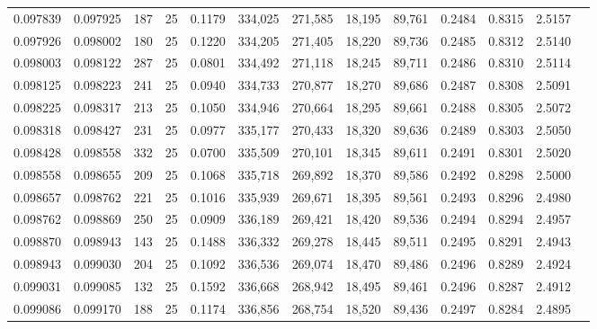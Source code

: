\begin{tabular}{rrrrrrrrrrrrr}
0.097839 & 0.097925 &   187 &  25 &                                     0.1179 & 334,025 & 271,585 &  18,195 &  89,761 & 0.2484 & 0.8315 & 2.5157 \\
0.097926 & 0.098002 &   180 &  25 &                                     0.1220 & 334,205 & 271,405 &  18,220 &  89,736 & 0.2485 & 0.8312 & 2.5140 \\
0.098003 & 0.098122 &   287 &  25 &                                     0.0801 & 334,492 & 271,118 &  18,245 &  89,711 & 0.2486 & 0.8310 & 2.5114 \\
0.098125 & 0.098223 &   241 &  25 &                                     0.0940 & 334,733 & 270,877 &  18,270 &  89,686 & 0.2487 & 0.8308 & 2.5091 \\
0.098225 & 0.098317 &   213 &  25 &                                     0.1050 & 334,946 & 270,664 &  18,295 &  89,661 & 0.2488 & 0.8305 & 2.5072 \\
0.098318 & 0.098427 &   231 &  25 &                                     0.0977 & 335,177 & 270,433 &  18,320 &  89,636 & 0.2489 & 0.8303 & 2.5050 \\
0.098428 & 0.098558 &   332 &  25 &                                     0.0700 & 335,509 & 270,101 &  18,345 &  89,611 & 0.2491 & 0.8301 & 2.5020 \\
0.098558 & 0.098655 &   209 &  25 &                                     0.1068 & 335,718 & 269,892 &  18,370 &  89,586 & 0.2492 & 0.8298 & 2.5000 \\
0.098657 & 0.098762 &   221 &  25 &                                     0.1016 & 335,939 & 269,671 &  18,395 &  89,561 & 0.2493 & 0.8296 & 2.4980 \\
0.098762 & 0.098869 &   250 &  25 &                                     0.0909 & 336,189 & 269,421 &  18,420 &  89,536 & 0.2494 & 0.8294 & 2.4957 \\
0.098870 & 0.098943 &   143 &  25 &                                     0.1488 & 336,332 & 269,278 &  18,445 &  89,511 & 0.2495 & 0.8291 & 2.4943 \\
0.098943 & 0.099030 &   204 &  25 &                                     0.1092 & 336,536 & 269,074 &  18,470 &  89,486 & 0.2496 & 0.8289 & 2.4924 \\
0.099031 & 0.099085 &   132 &  25 &                                     0.1592 & 336,668 & 268,942 &  18,495 &  89,461 & 0.2496 & 0.8287 & 2.4912 \\
0.099086 & 0.099170 &   188 &  25 &                                     0.1174 & 336,856 & 268,754 &  18,520 &  89,436 & 0.2497 & 0.8284 & 2.4895 \\

\end{tabular}
